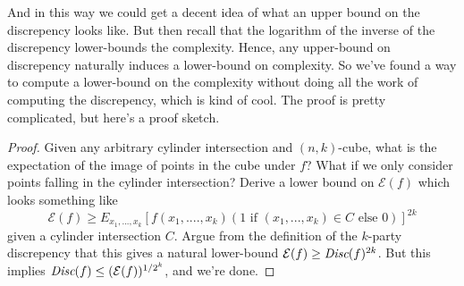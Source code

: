 \documentclass[12pt]{article}
\begin{document}
	And in this way we could get a decent idea of what an upper bound
	on the discrepency looks like.
	But then recall that the logarithm of the inverse of the discrepency
	lower-bounds the complexity.
	Hence, any upper-bound on discrepency naturally induces a lower-bound on complexity.
	So we've found a way to compute a lower-bound on the complexity without doing
	all the work of computing the discrepency, which is kind of cool.
The proof is pretty complicated, but here's a proof sketch.
\begin{proof}
Given any arbitrary cylinder intersection and $(n, k)$-cube, what is the expectation of the image of points in the cube under $f$?  What if we only consider points falling in the cylinder intersection?
Derive a lower bound on $\mathcal{E}(f)$ which looks something like
\[\mathcal{E}(f) \geq E_{x_1,...,x_k}[f(x_1,....,x_k)(1 \text{ if } (x_1,...,x_k) \in C \text{ else } 0)]^{2k}\]
given a cylinder intersection $C$.
Argue from the definition of the $k$-party discrepency that this gives a natural lower-bound $\mathcal{E}(f) \geq \emph{Disc}(f)^{2k}$.
But this implies \(\emph{Disc}(f) \leq (\mathcal{E}(f))^{1/2^k}\), and we're done.
\end{proof}
\end{document}
